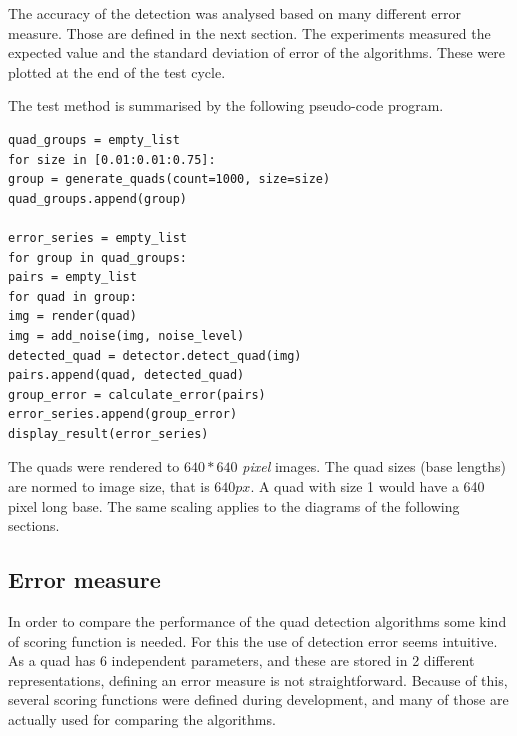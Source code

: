 The accuracy of the detection was analysed based on many different error measure.
Those are defined in the next section.
The experiments measured the expected value and the standard deviation of error of the algorithms.
These were plotted at the end of the test cycle.

The test method is summarised by the following pseudo-code program.
\begin{lstlisting}
quad_groups = empty_list
for size in [0.01:0.01:0.75]:
group = generate_quads(count=1000, size=size)
quad_groups.append(group)

error_series = empty_list
for group in quad_groups:
pairs = empty_list
for quad in group:
img = render(quad)
img = add_noise(img, noise_level)
detected_quad = detector.detect_quad(img)
pairs.append(quad, detected_quad)
group_error = calculate_error(pairs)
error_series.append(group_error)
display_result(error_series)	
\end{lstlisting}

The quads were rendered to $640*640$ \textit{pixel} images.
The quad sizes (base lengths) are normed to image size, that is $640 px$.
A quad with size 1 would have a 640 pixel long base.
The same scaling applies to the diagrams of the following sections. 

\subsection{Error measure}

In order to compare the performance of the quad detection algorithms some kind of scoring function is needed.
For this the use of detection error seems intuitive.
As a quad has 6 independent parameters, and these are stored in 2 different representations, defining an error measure is not straightforward.
Because of this, several scoring functions were defined during development, and many of those are actually used for comparing the algorithms.


